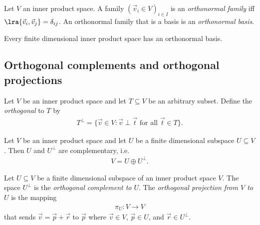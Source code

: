 \documentclass{article}
\begin{document}
\begin{definition}
	Let $V$ an inner product space. A family $(\vec v_i\in V)_{i\in I}$ is an \emph{orthonormal family}
	iff $\lra{\vec v_i,\vec v_j}=\delta_{ij}$. An orthonormal family that is a basis is an
	\emph{orthonormal basis}.
\end{definition}

\begin{theorem}[Theorem 5.1.10]
	Every finite dimensional inner product space has an orthonormal basis.
\end{theorem}

\subsection{Orthogonal complements and orthogonal projections}

\begin{definition}
	Let $V$ be an  inner product space and let $T\subseteq V$ be an arbitrary subset. Define
	the \emph{orthogonal} to $T$ by
	\begin{align*}
		T^\bot = \{\vec v \in V : \vec v \perp \vec t \text{ for all }\vec t \in T\}.
	\end{align*}
\end{definition}

\begin{proposition}[Proposition 5.2.2]
	Let $V$ be an inner product space and let $U$ be a finite dimensional subspace $U\subseteq V$.
	Then $U$ and $U^\bot$ are complementary, i.e.
	\begin{align*}
		V = U\oplus U^\bot.
	\end{align*}
\end{proposition}

\begin{definition}
	Let $U\subseteq V$ be a finite dimensional subspace of an inner product space $V$. The space $U^\bot$
	is the \emph{orthogonal complement to $U$}. The \emph{orthogonal projection from $V$ to $U$} is
	the mapping
	\begin{align*}
		\pi_U:V\to V
	\end{align*}
	that sends $\vec v = \vec p + \vec r$ to $\vec p$ where $\vec v\in V$, $\vec p\in U$, and $\vec r\in U^\bot$.
\end{definition}
\end{document}
